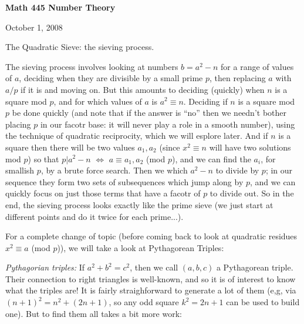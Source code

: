 





\loadmsbm

\nopagenumbers
\overfullrule=0pt


\def\ctln{\centerline}
\def\u{\underbar}
\def\ssk{\smallskip}
\def\msk{\medskip}
\def\bsk{\bigskip}
\def\dl{\displaystyle}
\def\ni{\noindent}
\def\ep{\epsilon}


\ctln{\bf Math 445 Number Theory}

\medskip

\ctln{October 1, 2008}

\bigskip

The Quadratic Sieve: the sieving process.

\ssk

The sieving process involves looking at numbers $b=a^2-n$ for a range of values of $a$,
deciding when they are 
divisible by a small prime $p$, then replacing $a$ with $a/p$ if it is and moving on.
But this amounts to deciding (quickly) when $n$ is a square mod $p$, and for which values 
of $a$ is $a^2\equiv n$. Deciding if $n$ is a square mod $p$  be done quickly
(and note that if the answer is ``no'' then we needn't bother placing $p$ in our
facotr base: it will never play a role in a smooth number), using the technique of 
quadratic reciprocity, which we will esplore later. And if $n$ is a square then 
there will be two values $a_1,a_2$ (since $x^2\equiv n$ will have two solutions mod $p$)
so that $p|a^2-n$ $\Leftrightarrow$ $a\equiv a_1,a_2$ (mod $p$), and we can find the $a_i$,
for smallish $p$, by a brute force search. Then we  which $a^2-n$ 
to divide by $p$; in our sequence they form two sets of subsequences which jump 
along by $p$, and we can quickly focus on just those terms that have a facotr of $p$
to divide out. So in the end, the sieving process looks exactly like the prime sieve
(we just start at different points and do it twice for each prime...).

\msk

For a complete change of topic (before coming back to look at quadratic residues $x^2\equiv a$ (mod $p$)),
we will take a look at Pythagorean Triples:

\msk

{\it Pythagorian triples:} If $a^2+b^2=c^2$, then we call $(a,b,c)$ a Pythagorean triple. Their connection to right triangles is
well-known, and so it is of interest to know what the triples are! It is fairly straighforward to generate a lot of them (e,g, via
$(n+1)^2=n^2+(2n+1)$, so any odd square $k^2=2n+1$ can be used to build one). But to find them all takes a bit more work:

